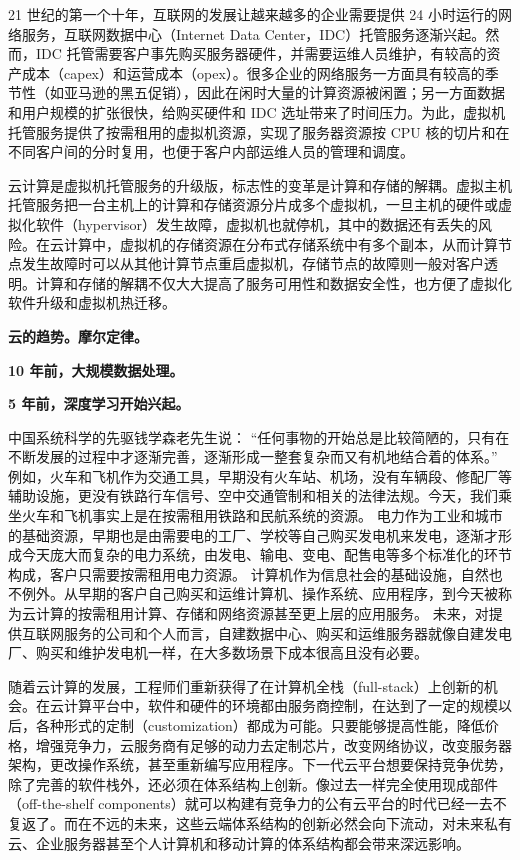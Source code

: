 21 世纪的第一个十年，互联网的发展让越来越多的企业需要提供 24 小时运行的网络服务，互联网数据中心（Internet Data Center，IDC）托管服务逐渐兴起。然而，IDC 托管需要客户事先购买服务器硬件，并需要运维人员维护，有较高的资产成本（capex）和运营成本（opex）。很多企业的网络服务一方面具有较高的季节性（如亚马逊的黑五促销），因此在闲时大量的计算资源被闲置；另一方面数据和用户规模的扩张很快，给购买硬件和 IDC 选址带来了时间压力。为此，虚拟机托管服务提供了按需租用的虚拟机资源，实现了服务器资源按 CPU 核的切片和在不同客户间的分时复用，也便于客户内部运维人员的管理和调度。

云计算是虚拟机托管服务的升级版，标志性的变革是计算和存储的解耦。虚拟主机托管服务把一台主机上的计算和存储资源分片成多个虚拟机，一旦主机的硬件或虚拟化软件（hypervisor）发生故障，虚拟机也就停机，其中的数据还有丢失的风险。在云计算中，虚拟机的存储资源在分布式存储系统中有多个副本，从而计算节点发生故障时可以从其他计算节点重启虚拟机，存储节点的故障则一般对客户透明。计算和存储的解耦不仅大大提高了服务可用性和数据安全性，也方便了虚拟化软件升级和虚拟机热迁移。


\textbf{云的趋势。摩尔定律。}

\textbf{10 年前，大规模数据处理。}

\textbf{5 年前，深度学习开始兴起。}



中国系统科学的先驱钱学森老先生说： ``任何事物的开始总是比较简陋的，只有在不断发展的过程中才逐渐完善，逐渐形成一整套复杂而又有机地结合着的体系。'' \cite{qianxuesen}
例如，火车和飞机作为交通工具，早期没有火车站、机场，没有车辆段、修配厂等辅助设施，更没有铁路行车信号、空中交通管制和相关的法律法规。今天，我们乘坐火车和飞机事实上是在按需租用铁路和民航系统的资源。
电力作为工业和城市的基础资源，早期也是由需要电的工厂、学校等自己购买发电机来发电，逐渐才形成今天庞大而复杂的电力系统，由发电、输电、变电、配售电等多个标准化的环节构成，客户只需要按需租用电力资源。
计算机作为信息社会的基础设施，自然也不例外。从早期的客户自己购买和运维计算机、操作系统、应用程序，到今天被称为云计算的按需租用计算、存储和网络资源甚至更上层的应用服务。
未来，对提供互联网服务的公司和个人而言，自建数据中心、购买和运维服务器就像自建发电厂、购买和维护发电机一样，在大多数场景下成本很高且没有必要。

随着云计算的发展，工程师们重新获得了在计算机全栈（full-stack）上创新的机会。在云计算平台中，软件和硬件的环境都由服务商控制，在达到了一定的规模以后，各种形式的定制（customization）都成为可能。只要能够提高性能，降低价格，增强竞争力，云服务商有足够的动力去定制芯片，改变网络协议，改变服务器架构，更改操作系统，甚至重新编写应用程序。下一代云平台想要保持竞争优势，除了完善的软件栈外，还必须在体系结构上创新。像过去一样完全使用现成部件（off-the-shelf components）就可以构建有竞争力的公有云平台的时代已经一去不复返了。而在不远的未来，这些云端体系结构的创新必然会向下流动，对未来私有云、企业服务器甚至个人计算机和移动计算的体系结构都会带来深远影响。


